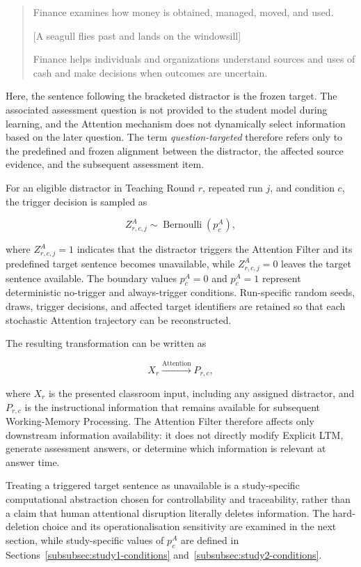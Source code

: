 \begin{quote}
\footnotesize\ttfamily
Finance examines how money is obtained, managed, moved, and used.

[A seagull flies past and lands on the windowsill]

Finance helps individuals and organizations understand sources and uses of cash and make decisions when outcomes are uncertain.
\end{quote}

Here, the sentence following the bracketed distractor is the frozen target. The associated assessment question is not provided to the student model during learning, and the Attention mechanism does not dynamically select information based on the later question. The term \textit{question-targeted} therefore refers only to the predefined and frozen alignment between the distractor, the affected source evidence, and the subsequent assessment item.

For an eligible distractor in Teaching Round \(r\), repeated run \(j\), and condition \(c\), the trigger decision is sampled as

\[
Z^A_{r,c,j}\sim \operatorname{Bernoulli}(p^A_c),
\]

where \(Z^A_{r,c,j}=1\) indicates that the distractor triggers the Attention Filter and its predefined target sentence becomes unavailable, while \(Z^A_{r,c,j}=0\) leaves the target sentence available. The boundary values \(p^A_c=0\) and \(p^A_c=1\) represent deterministic no-trigger and always-trigger conditions. Run-specific random seeds, draws, trigger decisions, and affected target identifiers are retained so that each stochastic Attention trajectory can be reconstructed.

The resulting transformation can be written as

\[
X_r \xrightarrow{\mathrm{Attention}} P_{r,c},
\]

where \(X_r\) is the presented classroom input, including any assigned distractor, and \(P_{r,c}\) is the instructional information that remains available for subsequent Working-Memory Processing. The Attention Filter therefore affects only downstream information availability: it does not directly modify Explicit LTM, generate assessment answers, or determine which information is relevant at answer time.

Treating a triggered target sentence as unavailable is a study-specific computational abstraction chosen for controllability and traceability, rather than a claim that human attentional disruption literally deletes information. The hard-deletion choice and its operationalisation sensitivity are examined in the next section, while study-specific values of \(p^A_c\) are defined in Sections~\ref{subsubsec:study1-conditions} and~\ref{subsubsec:study2-conditions}.

